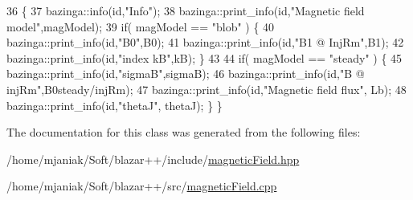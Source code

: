 \begin{DoxyCode}
36                                \{
37   bazinga::info(\textcolor{keywordtype}{id},\textcolor{stringliteral}{"Info"});
38   bazinga::print\_info(\textcolor{keywordtype}{id},\textcolor{stringliteral}{"Magnetic field model"},magModel);
39   \textcolor{keywordflow}{if}( magModel == \textcolor{stringliteral}{"blob"} ) \{
40       bazinga::print\_info(\textcolor{keywordtype}{id},\textcolor{stringliteral}{"B0"},B0);
41       bazinga::print\_info(\textcolor{keywordtype}{id},\textcolor{stringliteral}{"B1 @ InjRm"},B1);
42       bazinga::print\_info(\textcolor{keywordtype}{id},\textcolor{stringliteral}{"index kB"},kB); \}
43   
44   \textcolor{keywordflow}{if}( magModel == \textcolor{stringliteral}{"steady"} ) \{
45       bazinga::print\_info(\textcolor{keywordtype}{id},\textcolor{stringliteral}{"sigmaB"},sigmaB);
46       bazinga::print\_info(\textcolor{keywordtype}{id},\textcolor{stringliteral}{"B @ injRm"},B0steady/injRm);
47       bazinga::print\_info(\textcolor{keywordtype}{id},\textcolor{stringliteral}{"Magnetic field flux"}, Lb);
48       bazinga::print\_info(\textcolor{keywordtype}{id},\textcolor{stringliteral}{"thetaJ"}, thetaJ); \} \}
\end{DoxyCode}


The documentation for this class was generated from the following files\-:\begin{DoxyCompactItemize}
\item 
/home/mjaniak/\-Soft/blazar++/include/\hyperlink{magneticField_8hpp}{magnetic\-Field.\-hpp}\item 
/home/mjaniak/\-Soft/blazar++/src/\hyperlink{magneticField_8cpp}{magnetic\-Field.\-cpp}\end{DoxyCompactItemize}

